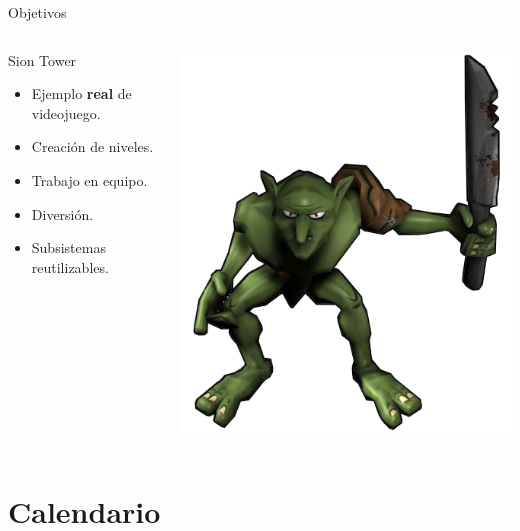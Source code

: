 \documentclass[green]{beamer}
\begin{document}
\begin{frame}{Objetivos}
    \begin{columns}[t]
    
    \column{200px}
	\begin{block}{Sion Tower}
	    \begin{itemize}
		\item Ejemplo \textbf{real} de videojuego.
		\item Creación de niveles.
		\item Trabajo en equipo.
		\item Diversión.
		\item Subsistemas reutilizables.
	    \end{itemize}
	\end{block}
	
    \column{100px}
    
    \begin{center}
	\includegraphics[scale=0.23]{img/goblin.png}
    \end{center}
    
    \end{columns}
\end{frame}

\section{Calendario}
\end{document}
